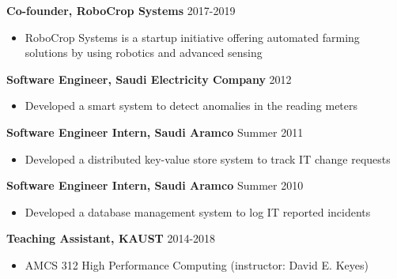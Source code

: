 \documentclass[9pt,a4paper]{extarticle}
\begin{document}
{
\textbf{Co-founder, RoboCrop Systems} \hfill 2017-2019
\begin{itemize}
  \item RoboCrop Systems is a startup initiative offering automated farming
  solutions by using robotics and advanced sensing\\
\end{itemize}

\textbf{Software Engineer, Saudi Electricity Company} \hfill 2012
\begin{itemize}
  \item Developed a smart system to detect anomalies in the reading meters\\
\end{itemize}

\textbf{Software Engineer Intern, Saudi Aramco} \hfill Summer 2011
\begin{itemize}
  \item Developed a distributed key-value store system to track IT change requests\\
\end{itemize}

\textbf{Software Engineer Intern, Saudi Aramco} \hfill Summer 2010
\begin{itemize}
  \item Developed a database management system to log IT reported incidents
\end{itemize}
}
\bigskip

{
\textbf{Teaching Assistant, KAUST} \hfill 2014-2018
\begin{itemize}
  \item AMCS 312 High Performance Computing (instructor: David E. Keyes)
\end{itemize}
}
\bigskip
\end{document}
